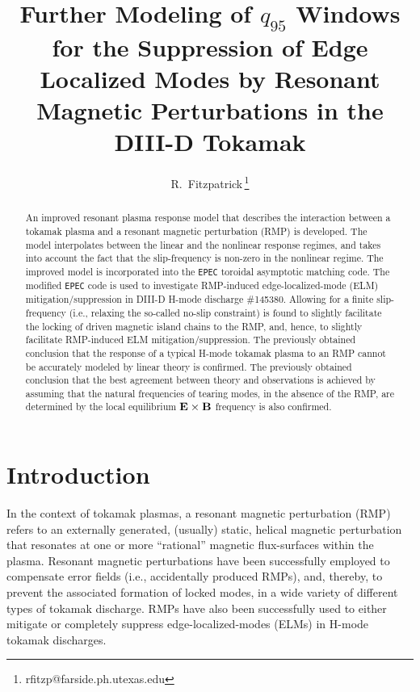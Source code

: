 \documentclass[12pt,prb,aps]{revtex4-1}
\begin{document}
\title {Further Modeling of $q_{95}$ Windows for the Suppression of Edge Localized Modes by Resonant Magnetic Perturbations in the DIII-D Tokamak}

\author{R.~Fitzpatrick\,\footnote{rfitzp@farside.ph.utexas.edu}}

\begin{abstract}
An improved resonant plasma response model that describes the interaction between a tokamak plasma and a resonant magnetic perturbation  (RMP) is developed. 
The model interpolates between the linear and the nonlinear response regimes, and takes into account the fact that the slip-frequency
is non-zero in the nonlinear regime. The improved model is incorporated into the {\tt EPEC} toroidal asymptotic matching code.
The modified {\tt EPEC} code is used to investigate RMP-induced edge-localized-mode (ELM) mitigation/suppression in DIII-D H-mode discharge \#145380. 
Allowing for a finite slip-frequency (i.e., relaxing the so-called no-slip constraint) is found to slightly facilitate the locking of
driven magnetic island chains to the RMP, and, hence, to slightly facilitate RMP-induced ELM mitigation/suppression.  The previously obtained conclusion 
that the response of a typical H-mode tokamak plasma to an RMP cannot be accurately modeled by linear theory is confirmed. The previously obtained conclusion that the best agreement between theory and observations is achieved by assuming that the
natural frequencies of tearing modes, in the absence of the RMP, are determined by the local equilibrium ${\bf E}\times{\bf B}$ frequency is also confirmed.
\end{abstract}

\maketitle

\section{Introduction}
In the context of tokamak plasmas, a resonant magnetic perturbation (RMP) refers to an externally
generated, (usually) static, helical magnetic perturbation that resonates at
one or more ``rational'' magnetic flux-surfaces within the plasma. Resonant magnetic perturbations have been successfully
employed to compensate error fields (i.e., accidentally produced RMPs), and, thereby,  to prevent the associated formation of
locked modes, in a wide variety of different types of tokamak discharge. \cite{error1,error2,error3} RMPs have also been  successfully used to either  
mitigate or completely suppress  edge-localized-modes (ELMs) in H-mode tokamak discharges.\cite{elm1,elm2,elm3,elm4,elm5,elm6}
\end{document}

